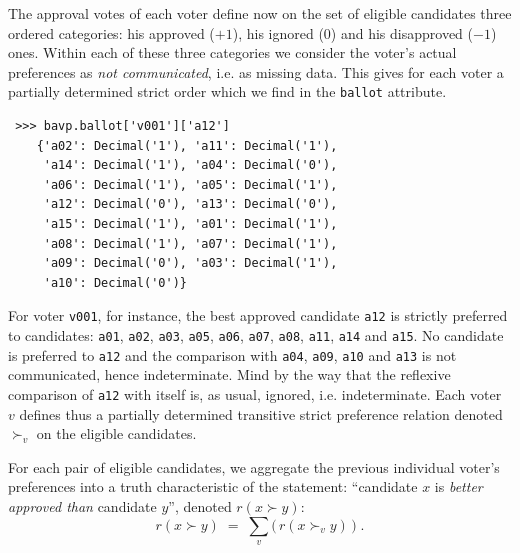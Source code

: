 The approval votes of each voter define now on the set of eligible candidates three ordered categories: his approved ($+1$), his ignored ($0$) and his disapproved ($-1$) ones. Within each of these three categories we consider the voter's actual preferences as \emph{not communicated}, i.e. as missing data. This gives for each voter a partially determined strict order which we find in the \texttt{ballot} attribute.
\begin{lstlisting}
 >>> bavp.ballot['v001']['a12']
    {'a02': Decimal('1'), 'a11': Decimal('1'),
     'a14': Decimal('1'), 'a04': Decimal('0'),
     'a06': Decimal('1'), 'a05': Decimal('1'),
     'a12': Decimal('0'), 'a13': Decimal('0'),
     'a15': Decimal('1'), 'a01': Decimal('1'),
     'a08': Decimal('1'), 'a07': Decimal('1'),
     'a09': Decimal('0'), 'a03': Decimal('1'),
     'a10': Decimal('0')}
\end{lstlisting}
For voter \texttt{v001}, for instance, the best approved candidate \texttt{a12} is strictly preferred to candidates: \texttt{a01}, \texttt{a02}, \texttt{a03}, \texttt{a05}, \texttt{a06}, \texttt{a07}, \texttt{a08}, \texttt{a11}, \texttt{a14} and \texttt{a15}. No candidate is preferred to \texttt{a12} and the comparison with \texttt{a04}, \texttt{a09}, \texttt{a10} and \texttt{a13} is not communicated, hence indeterminate. Mind by the way that the reflexive comparison of \texttt{a12} with itself is, as usual, ignored, i.e. indeterminate. Each voter $v$ defines thus a partially determined transitive strict preference relation denoted $\succ_v$ on the eligible candidates.

For each pair of eligible candidates, we aggregate the previous individual voter's preferences into a truth characteristic of the statement: ``candidate $x$ is \emph{better approved than} candidate $y$'', denoted $r(x \succ y)$:
\begin{equation}
  r(x \succ y)\;=\; \sum_v \big(\,r(x \succ_v y)\, \big)\;.
\end{equation}  

